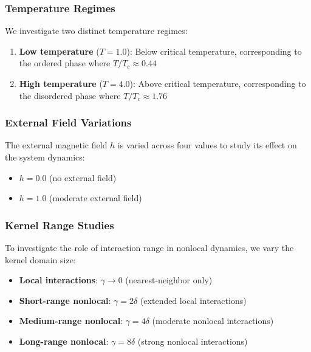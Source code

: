 \documentclass[11pt,a4paper]{article}
\begin{document}
\subsubsection{Temperature Regimes}

We investigate two distinct temperature regimes:

\begin{enumerate}
    \item \textbf{Low temperature} ($T = 1.0$): Below critical temperature, corresponding to the ordered phase where $T/T_c \approx 0.44$
    \item \textbf{High temperature} ($T = 4.0$): Above critical temperature, corresponding to the disordered phase where $T/T_c \approx 1.76$
\end{enumerate}

\subsubsection{External Field Variations}

The external magnetic field $h$ is varied across four values to study its effect on the system dynamics:

\begin{itemize}
    \item $h = 0.0$ (no external field)
    \item $h = 1.0$ (moderate external field)
\end{itemize}

\subsubsection{Kernel Range Studies}

To investigate the role of interaction range in nonlocal dynamics, we vary the kernel domain size:

\begin{itemize}
    \item \textbf{Local interactions}: $\gamma \to 0$ (nearest-neighbor only)
    \item \textbf{Short-range nonlocal}: $\gamma = 2\delta$ (extended local interactions)
    \item \textbf{Medium-range nonlocal}: $\gamma = 4\delta$ (moderate nonlocal interactions)
    \item \textbf{Long-range nonlocal}: $\gamma = 8\delta$ (strong nonlocal interactions)
\end{itemize}
\end{document}
